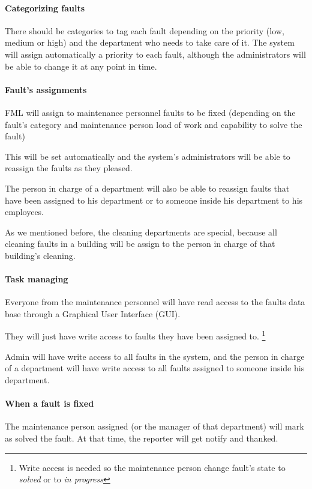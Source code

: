 \paragraph{Categorizing faults} There should be categories to tag each fault depending on the priority (low, medium or high) and the department who needs to take care of it. The system will assign automatically a priority to each fault, although the administrators will be able to change it at any point in time.

\paragraph{Fault's assignments} FML will assign to maintenance personnel faults to be fixed (depending on the fault's category and maintenance person load of work and capability to solve the fault)

This will be set automatically and the system's administrators will be able to reassign the faults as they pleased.

The person in charge of a department will also be able to reassign faults that have been assigned to his department or to someone inside his department to his employees.

As we mentioned before, the cleaning departments are special, because all cleaning faults in a building will be assign to the person in charge of that building's cleaning.


\paragraph{Task managing} Everyone from the maintenance personnel will have read access to the faults data base through a Graphical User Interface (GUI).

They will just have write access to faults they have been assigned to. \footnote{Write access is needed so the maintenance person change fault's state to \textit{solved} or to \textit{in progress}}

Admin will have write access to all faults in the system, and the person in charge of a department will have write access to all faults assigned to someone inside his department.

\paragraph{When a fault is fixed} The maintenance person assigned (or the manager of that department) will mark as solved the fault. At that time, the reporter will get notify and thanked.


